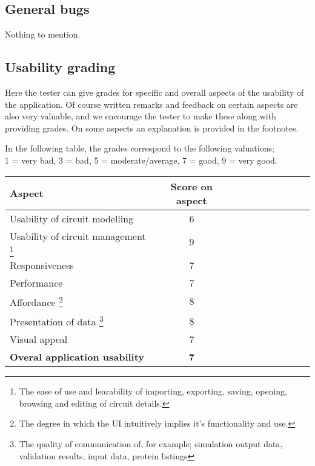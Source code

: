 \documentclass[a4paper]{article}
\begin{document}
\subsection{General bugs}
Nothing to mention.

\vfill
\subsection{Usability grading}
Here the tester can give grades for specific and overall aspects of the usability of the application. Of course written remarks and feedback on certain aspects are also very valuable, and we encourage the tester to make these along with providing grades. On some aspects an explanation is provided in the footnotes.

In the following table, the grades correspond to the following valuations;\\ 1 = very bad, 3 = bad, 5 = moderate/average, 7 = good, 9 = very good.
\begin{center}
\begin{tabularx}{\textwidth}{p{10cm} cc cc c cc cc} \toprule
\textbf{Aspect} & \multicolumn{1}{c}{\textbf{Score on aspect}} \\ \midrule
Usability of circuit modelling &6\\ \midrule
Usability of circuit management \footnote{The ease of use and learability of importing, exporting, saving, opening, browsing and editing of circuit details.} &9 \\ \midrule
Responsiveness &7 \\ \midrule
Performance &7 \\ \midrule
Affordance \footnote{The degree in which the UI intuitively implies it's functionality and use.} &8 \\ \midrule
Presentation of data \footnote{The quality of communication of, for example; simulation output data, validation results, input data, protein listings} &8 \\ \midrule
Visual appeal &7 \\ \midrule
\textbf{Overal application usability} &\textbf{7} \\ \bottomrule
\end{tabularx}
\end{center}
\end{document}
